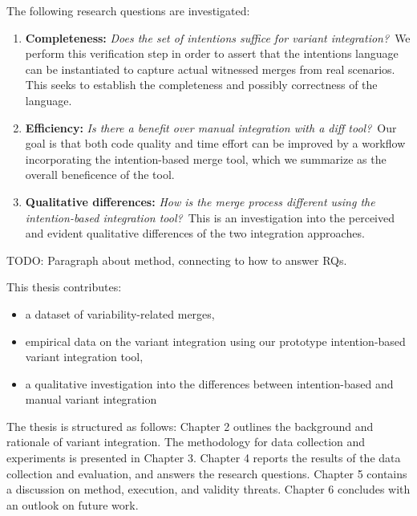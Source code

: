 The following research questions are investigated:

\newcommand{\RQA}{Does the set of intentions suffice for variant integration?}
\newcommand{\RQB}{Is there a benefit over manual integration with a diff tool?}
\newcommand{\RQC}{How is the merge process different using the intention-based integration tool?}

\begin{enumerate}[label={Q\arabic*}]

        \item\label{rq-a} \textbf{Completeness:} \textit{\RQA}~We perform this verification step in order to assert that the intentions language can be instantiated to capture actual witnessed merges from real scenarios. This seeks to establish the completeness and possibly correctness of the language.

        \item\label{rq-b} \textbf{Efficiency:} \textit{\RQB}~Our goal is that both code quality and time effort can be improved by a workflow incorporating the intention-based merge tool, which we summarize as the overall beneficence of the tool.

        
        \item\label{rq-c} \textbf{Qualitative differences:} \textit{\RQC}~This is an investigation into the perceived and evident qualitative differences of the two integration approaches.
        
\end{enumerate}

TODO: Paragraph about method, connecting to how to answer RQs.

This thesis contributes:
\begin{itemize}
    \item a dataset of variability-related merges,
    \item empirical data on the variant integration using our prototype intention-based variant integration tool,
    \item a qualitative investigation into the differences between intention-based and manual variant integration
\end{itemize}

The thesis is structured as follows: Chapter 2 outlines the background and rationale of variant integration. The methodology for data collection and experiments is presented in Chapter 3. Chapter 4 reports the results of the data collection and evaluation, and answers the research questions. Chapter 5 contains a discussion on method, execution, and validity threats. Chapter 6 concludes with an outlook on future work.

